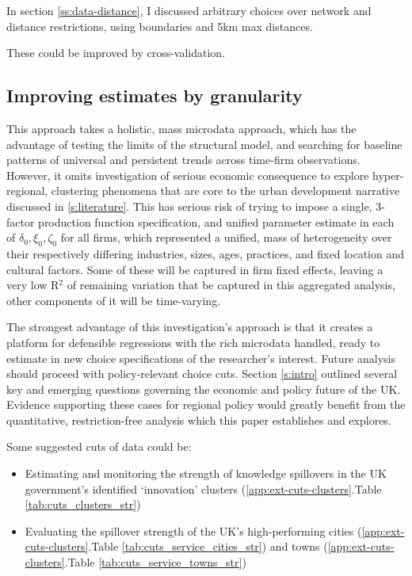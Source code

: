In section \ref{ss:data-distance}, I discussed arbitrary choices over
network and distance restrictions, using  boundaries
and 5km max distances.

These could be improved by cross-validation.

\subsection{Improving estimates by granularity}
\label{ss:ext-agglomeration-neg-land}

This approach takes a holistic, mass microdata approach,
which has the advantage of testing the limits of the structural model,
and searching for baseline patterns of universal and persistent
trends across time-firm observations.
However, it omits investigation of serious economic consequence
to explore hyper-regional, clustering phenomena
that are core to the urban development narrative
discussed in \ref{s:literature}. This has serious risk of trying to impose a single,
3-factor production function specification, and unified parameter estimate
in each of $\delta_0, \xi_0, \zeta_0$ for all firms,
which represented a unified, mass of heterogeneity over their respectively
differing industries, sizes, ages, practices, and fixed
location and cultural factors.
Some of these will be captured in firm fixed effects,
leaving a very low R$^2$ of remaining variation that be captured
in this aggregated analysis, other components of it will be time-varying.
\par
The strongest advantage of this investigation's approach
is that it creates a platform for defensible regressions
with the rich microdata handled, ready to estimate in new choice specifications
of the researcher's interest. Future analysis should proceed with
policy-relevant choice cuts. Section \ref{s:intro} outlined
several key and emerging questions governing the economic and policy
future of the UK. Evidence supporting these cases for regional policy
would greatly benefit from the quantitative, restriction-free analysis
which this paper establishes and explores.
\par
Some suggested cuts of data could be:
\begin{itemize}
    \item Estimating and monitoring the strength of knowledge spillovers in the UK government's identified `innovation'
    clusters (\ref{app:ext-cuts-clusters}.Table \ref{tab:cuts_clusters_str})
    \item Evaluating the spillover strength of the UK's high-performing
    cities (\ref{app:ext-cuts-clusters}.Table \ref{tab:cuts_service_cities_str})
    and towns (\ref{app:ext-cuts-clusters}.Table \ref{tab:cuts_service_towns_str})
\end{itemize}

